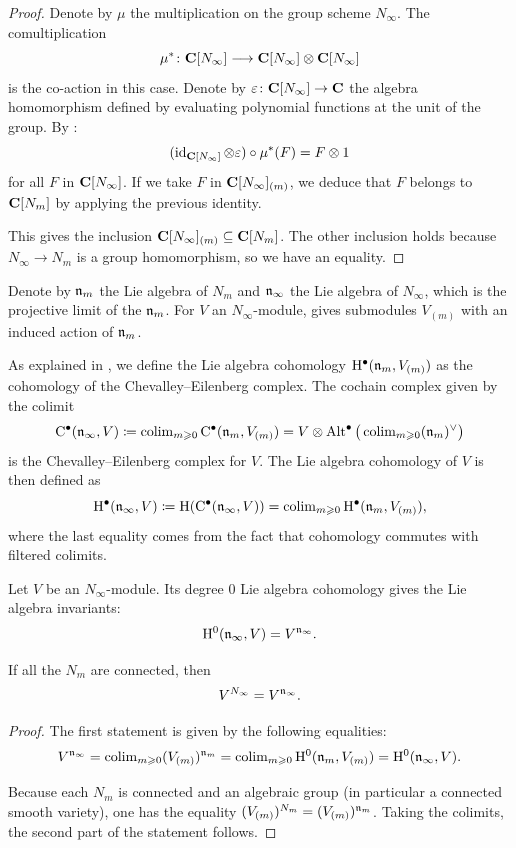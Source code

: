 \begin{proof}
	Denote by $\mu$ the multiplication on the group scheme $N_\infty$. The comultiplication
	\[ \mu^*\colon \mathbf{C}[N_\infty] \longrightarrow \mathbf{C}[N_\infty] \otimes \mathbf{C}[N_\infty] \]
	is the co-action in this case. Denote by $\varepsilon \colon \mathbf{C}[N_\infty] \rightarrow \mathbf{C}$ the algebra homomorphism defined by evaluating polynomial functions at the unit of the group. By \cite[Proposition 3.6]{milne2017algebraic}:
	\[ (\operatorname{id}_{\mathbf{C}[N_\infty]} \otimes \varepsilon) \circ \mu^*(F) = F \otimes 1 \]
	for all $F$ in $\mathbf{C}[N_\infty]$. If we take $F$ in $\mathbf{C}[N_\infty]_{(m)}$, we deduce that $F$ belongs to $\mathbf{C}[N_m]$ by applying the previous identity.
	
	This gives the inclusion $\mathbf{C}[N_\infty]_{(m)} \subseteq \mathbf{C}[N_m]$. The other inclusion holds because $N_\infty \rightarrow N_m$ is a group homomorphism, so we have an equality.
\end{proof}

Denote by $\mathfrak n_m$ the Lie algebra of $N_m$ and $\mathfrak n_\infty$ the Lie algebra of $N_\infty$, which is the projective limit of the $\mathfrak n_m$. For $V$ an $N_\infty$-module,  gives submodules $V_{(m)}$ with an induced action of $\mathfrak n_m$. 

As explained in , we define the Lie algebra cohomology $\mathrm{H}^\bullet(\mathfrak n_m, V_{(m)})$ as the cohomology of the Chevalley--Eilenberg complex. The cochain complex given by the colimit
\[ \mathrm{C}^\bullet(\mathfrak n_\infty, V) \coloneqq \operatorname{colim}\limits_{m \geqslant 0} \mathrm{C}^\bullet(\mathfrak n_m, V_{(m)}) = V \otimes \operatorname{Alt}^\bullet\big(\operatorname{colim}\limits_{m \geqslant 0} (\mathfrak n_m)^\vee\big) \]
is the Chevalley--Eilenberg complex for $V$. The Lie algebra cohomology of $V$ is then defined as
\[ \mathrm{H}^\bullet(\mathfrak n_\infty, V) \coloneqq \mathrm{H}(\mathrm{C}^\bullet(\mathfrak n_\infty, V)) = \operatorname{colim}\limits_{m \geqslant 0}\mathrm{H}^\bullet(\mathfrak n_m, V_{(m)}), \]
where the last equality comes from the fact that cohomology commutes with filtered colimits.

\begin{lemma} \label{lemma:coholology-pro-algebra}
	Let $V$ be an $N_\infty$-module. Its degree $0$ Lie algebra cohomology gives the Lie algebra invariants:
	\[ \mathrm{H}^0(\mathfrak n_\infty, V) = V^{\mathfrak n_\infty}. \]
	
	
	If all the $N_m$ are connected, then 
	\[ V^{N_\infty} = V^{\mathfrak n_\infty}. \]
\end{lemma}

\begin{proof}
	The first statement is given by the following equalities:
	\[ V^{\mathfrak n_\infty} =  \operatorname{colim}\limits_{m \geqslant 0} (V_{(m)})^{\mathfrak n_m} = \operatorname{colim}\limits_{m \geqslant 0} \mathrm{H}^0(\mathfrak n_m, V_{(m)}) = \mathrm{H}^0(\mathfrak n_\infty, V). \]
	
	Because each $N_m$ is connected and an algebraic group (in particular a connected smooth variety), one has the equality $(V_{(m)})^{N_m} = (V_{(m)})^{\mathfrak n_m}$. Taking the colimits, the second part of the statement follows.
\end{proof}

